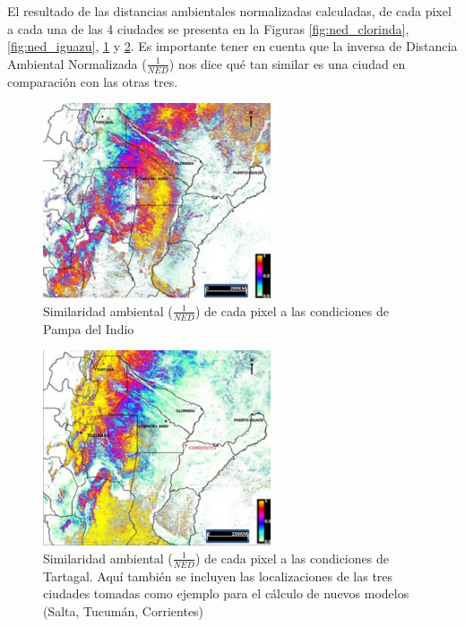   \par El resultado de las distancias ambientales normalizadas calculadas, de
    cada pixel a cada una de las 4 ciudades se presenta en la Figuras
    \ref{fig:ned_clorinda}, \ref{fig:ned_iguazu}, \ref{fig:ned_pampa} y
    \ref{fig:ned_tartagal}. Es importante tener en cuenta que la inversa de Distancia Ambiental
    Normalizada ($\frac{1}{NED}$) nos dice qué tan similar es una ciudad en
    comparación con las otras tres.
    \begin{figure}[hbt]
      \centering%
      \includegraphics[width=0.6\textwidth]{images/ned_pampa}%
      \caption{Similaridad ambiental ($\frac{1}{NED}$)
              de cada pixel a las condiciones de Pampa del Indio}\label{fig:ned_pampa}
    \end{figure}


    \begin{figure}[hbt]
      \centering%
      \includegraphics[width=0.6\textwidth]{images/ned_tartagal}%
      \caption{Similaridad ambiental ($\frac{1}{NED}$)
              de cada pixel a las condiciones de Tartagal.
              Aquí también se incluyen las localizaciones de las tres ciudades
              tomadas como ejemplo para el cálculo de nuevos modelos
              (Salta, Tucumán, Corrientes)}\label{fig:ned_tartagal}
    \end{figure}

